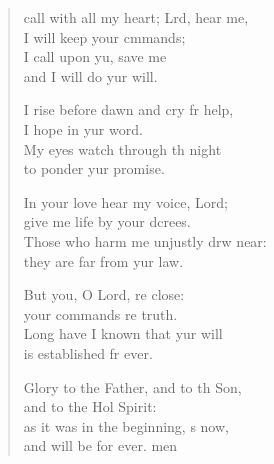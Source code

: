 \settowidth{\versewidth}{I call with all my heart; Lord, hear me, *}
\begin{verse}%
  \begin{patverse}
     call with all my heart; Lrd, hear me,\Med\\
I will keep your cmmands;\\
I call upon yu, save me\Med\\
and I will do yur will.

I rise before dawn and cry fr help,\Med\\
I hope in yur word.\\
My eyes watch through th night\Med\\
to ponder yur promise.

In your love hear my voice,  Lord;\Med\\
give me life by your dcrees.\\
Those who harm me unjustly drw near:\Med\\
they are far from yur law.

But you, O Lord, re close:\Med\\
your commands re truth.\\
Long have I known that yur will\Med\\
is established fr ever.

Glory to the Father, and to th Son,\Med\\
and to the Hol Spirit:\\
as it was in the beginning, \pointup{\i}s now,\Med\\
and will be for ever. men
  \end{patverse}
\end{verse}
